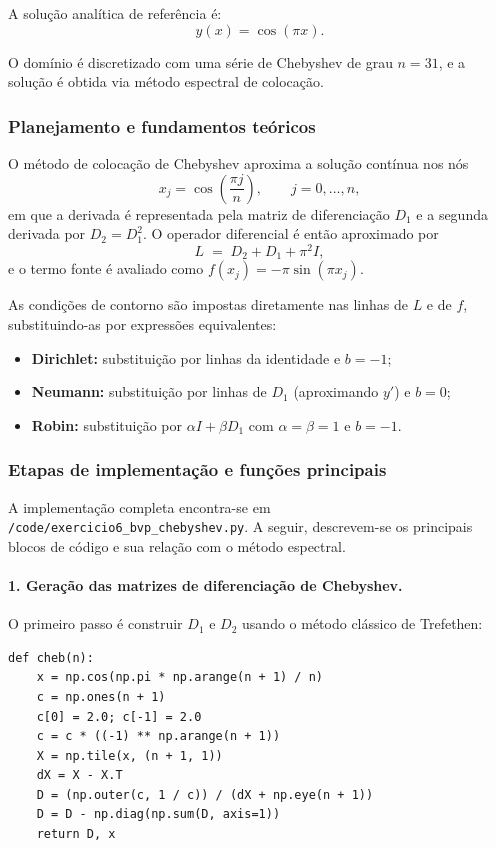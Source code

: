 \documentclass[12pt,a4paper]{article}
\begin{document}
A solução analítica de referência é:
\[
y(x) = \cos(\pi x).
\]

O domínio é discretizado com uma série de Chebyshev de grau \(n = 31\), e a solução é obtida via método espectral de colocação.

\subsubsection{Planejamento e fundamentos teóricos}

O método de colocação de Chebyshev aproxima a solução contínua nos nós
\[
x_j = \cos\left( \frac{\pi j}{n} \right), \qquad j = 0,\ldots,n,
\]
em que a derivada é representada pela matriz de diferenciação \(D_1\) e a segunda derivada por \(D_2 = D_1^2\).
O operador diferencial é então aproximado por
\[
L \;=\; D_2 + D_1 + \pi^2 I,
\]
e o termo fonte é avaliado como \(f(x_j) = -\pi \sin(\pi x_j)\).

As condições de contorno são impostas diretamente nas linhas de \(L\) e de \(f\), substituindo-as por expressões equivalentes:
\begin{itemize}
  \item \textbf{Dirichlet:} substituição por linhas da identidade e \(b=-1\);
  \item \textbf{Neumann:} substituição por linhas de \(D_1\) (aproximando \(y'\)) e \(b=0\);
  \item \textbf{Robin:} substituição por \(\alpha I + \beta D_1\) com \(\alpha=\beta=1\) e \(b=-1\).
\end{itemize}

\subsubsection{Etapas de implementação e funções principais}

A implementação completa encontra-se em \texttt{/code/exercicio6\_bvp\_chebyshev.py}.  
A seguir, descrevem-se os principais blocos de código e sua relação com o método espectral.

\paragraph{1. Geração das matrizes de diferenciação de Chebyshev.}
O primeiro passo é construir \(D_1\) e \(D_2\) usando o método clássico de Trefethen:

\begin{verbatim}
def cheb(n):
    x = np.cos(np.pi * np.arange(n + 1) / n)
    c = np.ones(n + 1)
    c[0] = 2.0; c[-1] = 2.0
    c = c * ((-1) ** np.arange(n + 1))
    X = np.tile(x, (n + 1, 1))
    dX = X - X.T
    D = (np.outer(c, 1 / c)) / (dX + np.eye(n + 1))
    D = D - np.diag(np.sum(D, axis=1))
    return D, x
\end{verbatim}
\end{document}
